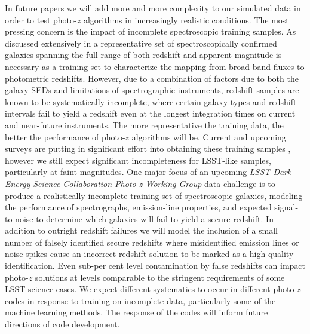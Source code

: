 \documentclass[usenatbib]{mn2e}
\begin{document}
In future papers we will add more and more complexity to our simulated data in order to test photo-$z$ algorithms in increasingly realistic conditions.  The most pressing concern is the impact of incomplete spectroscopic training samples.  As discussed extensively in \citet{Newman:2015} a representative set of spectroscopically confirmed galaxies spanning the full range of both redshift and apparent magnitude is necessary as a training set to characterize the mapping from broad-band fluxes to photometric redshifts.  However, due to a combination of factors due to both the galaxy SEDs and limitations of spectrographic instruments, redshift samples are known to be systematically incomplete, where certain galaxy types and redshift intervals fail to yield a redshift even at the longest integration times on current and near-future instruments.  The more representative the training data, the better the performance of photo-$z$ algorithms will be.  Current and upcoming surveys are putting in significant effort into obtaining these training samples \citep[e.~g.\,][]{Masters:2017}, however we still expect significant incompleteness for LSST-like samples, particularly at faint magnitudes.  One major focus of an upcoming {\it LSST Dark Energy Science Collaboration Photo-z Working Group} data challenge is to produce a realistically incomplete training set of spectroscopic galaxies, modeling the performance of spectrographs, emission-line properties, and expected signal-to-noise to determine which galaxies will fail to yield a secure redshift.  In addition to outright redshift failures we will model the inclusion of a small number of falsely identified secure redshifts where misidentified emission lines or noise spikes cause an incorrect redshift solution to be marked as a high quality identification.  Even sub-per cent level contamination by false redshifts can impact photo-$z$ solutions at levels comparable to the stringent  requirements of some LSST science cases.
We expect different systematics to occur in different photo-$z$ codes in response to training on incomplete data, particularly some of the machine learning methods.  The response of the codes will inform future directions of code development.  
\end{document}
